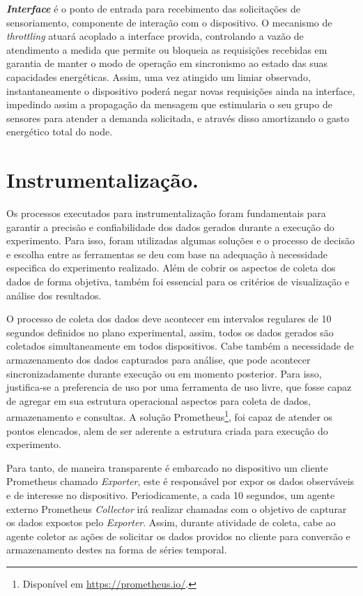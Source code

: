 \textbf{\textit{Interface}} é o ponto de entrada para recebimento das solicitações de sensoriamento, componente de interação com o dispositivo. O mecanismo de \textit{throttling} atuará acoplado a interface provida, controlando a vazão de atendimento a medida que permite ou bloqueia as requisições recebidas em garantia de manter o modo de operação em sincronismo ao estado das suas capacidades energéticas. Assim, uma vez atingido um limiar observado, instantaneamente o dispositivo poderá negar novas requisições ainda na interface, impedindo assim a propagação da mensagem que estimularia o seu grupo de sensores para atender a demanda solicitada, e através disso amortizando o gasto energético total do node.




\section{Instrumentalização.}
\label{cap6:instrumentalizacao}
Os processos executados para instrumentalização foram fundamentais para garantir a precisão e confiabilidade dos dados gerados durante a execução do experimento. Para isso, foram utilizadas algumas soluções e o processo de decisão e escolha entre as ferramentas se deu com base na adequação à necessidade especifica do experimento realizado. Além de cobrir os aspectos de coleta dos dados de forma objetiva, também foi essencial para os critérios de visualização e análise dos resultados.

O processo de coleta dos dados deve acontecer em intervalos regulares de 10 segundos definidos no plano experimental, assim, todos os dados gerados são coletados simultaneamente em todos dispositivos. Cabe também a necessidade de armazenamento dos dados capturados para análise, que pode acontecer sincronizadamente durante execução ou em momento posterior. Para isso, justifica-se a preferencia de uso por uma ferramenta de uso livre, que fosse capaz de agregar em sua estrutura operacional aspectos para coleta de dados, armazenamento e consultas. A solução Prometheus\footnote{Disponível em \url{https://prometheus.io/}.}, foi capaz de atender os pontos elencados, alem de ser aderente a estrutura criada para execução do experimento.

Para tanto, de maneira transparente é embarcado no dispositivo um cliente Prometheus chamado \textit{Exporter}, este é responsável por expor os dados observáveis e de interesse no dispositivo. Periodicamente, a cada 10 segundos, um agente externo Prometheus \textit{Collector} irá realizar chamadas com o objetivo de capturar os dados expostos pelo \textit{Exporter}. Assim, durante atividade de coleta, cabe ao agente coletor as ações de solicitar os dados providos no cliente para conversão e armazenamento destes na forma de séries temporal. 

